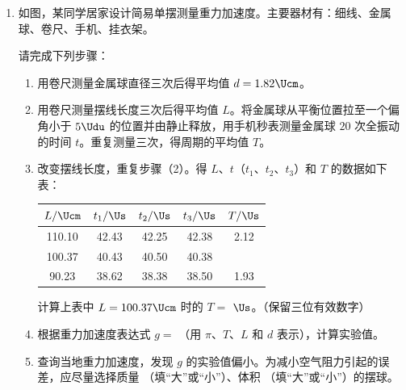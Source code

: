 \documentclass[\gkver]{gaokaozhenti}
\begin{document}
\begin{enumerate}
{由功能关系有产生的焦耳热 $Q=|W|$

联立解得 $Q=\frac{B^{2}d^{2}v_{0}\tan^{2}\beta}{r\tan\alpha}$，故 D 错误。

故选 AC。
}
\item
如图，某同学居家设计简易单摆测量重力加速度。主要器材有：细线、金属球、卷尺、手机、挂衣架。

请完成下列步骤：
\onepicture[align=right, h=4.00cm]{}
\begin{enumerate}
	\item
	用卷尺测量金属球直径三次后得平均值 $d=1.82\Ucm$。
	\item
	用卷尺测量摆线长度三次后得平均值 $L$。将金属球从平衡位置拉至一个偏角小于 $5\Udu$ 的位置并由静止释放，用手机秒表测量金属球 $20$ 次全振动的时间 $t$。重复测量三次，得周期的平均值 $T$。
	\item
	改变摆线长度，重复步骤（2）。得 $L$、$t$（$t_{1}$、$t_{2}$、$t_{3}$）和 $T$ 的数据如下表：

	\begin{center}
	\begin{tabular}{|c|c|c|c|c|}
	\hline
	$L/\Ucm$ & $t_{1}/\Us$ & $t_{2}/\Us$ & $t_{3}/\Us$ & $T/\Us$ \\ \hline
	110.10 & 42.43 & 42.25 & 42.38 & 2.12 \\ \hline
	100.37 & 40.43 & 40.50 & 40.38 &  \\ \hline
	90.23 & 38.62 & 38.38 & 38.50 & 1.93 \\ \hline
	\end{tabular}
	\end{center}

	计算上表中 $L=100.37\Ucm$ 时的 $T=$  $\Us$。（保留三位有效数字）
	\item
	根据重力加速度表达式 $g=$ （用 $\pi$、$T$、$L$ 和 $d$ 表示），计算实验值。
	\item
	查询当地重力加速度，发现 $g$ 的实验值偏小。为减小空气阻力引起的误差，应尽量选择质量 （填“大”或“小”）、体积 （填“大”或“小”）的摆球。
\end{enumerate}

\end{enumerate}
\end{document}

